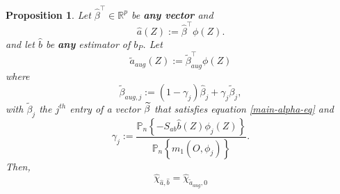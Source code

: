 \documentclass{article}
\newtheorem{proposition}[theorem]{Proposition}
\begin{document}
\begin{proposition}\label{prop:main}
Let $\widehat{\beta }^{\top }\in \mathbb{R}^{p}$ be \textbf{any vector} and 
\begin{equation*}
\widehat{a}(Z):=\widehat{\beta }^{\top }\phi (Z).
\end{equation*}%
and let $\widehat{b}$ be \textbf{any} estimator of $b_{P}$. Let 
\begin{equation*}
\widetilde{a}_{aug}\left( Z\right) :=\widetilde{\beta }_{aug}^{\top }\phi (Z)
\end{equation*}%
where%
\begin{equation*}
\widetilde{\beta }_{aug,j}:=(1-\gamma _{j})\widehat{\beta }_{j}+\gamma _{j}%
\widetilde{\beta }_{j},
\end{equation*}%
with $\widetilde{\beta }_{j}$ the $j^{th}$ entry of a vector $\widetilde{%
\beta }$ that satisfies equation \eqref{main-alpha-eq} and 
\begin{equation*}
\gamma _{j}:=\frac{\mathbb{P}_{n}\left\{ -S_{ab}\widehat{b}(Z)\phi
_{j}(Z)\right\} }{\mathbb{P}_{n}\left\{ m_{1}(O,\phi _{j})\right\} }.
\end{equation*}%
Then, 
\begin{equation}
\widehat{\chi }_{\widehat{a},\widehat{b}}=\widehat{\chi }_{\widetilde{a}%
_{aug},0}  \label{eq:main_aug}
\end{equation}
\end{proposition}
\end{document}
